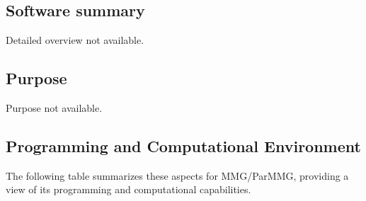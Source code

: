 \subsection{Software summary}
\label{sec:MMG/ParMMG:summary}
Detailed overview not available.



\subsection{Purpose}
\label{sec:MMG/ParMMG:purpose}
Purpose not available.

\subsection{Programming and Computational Environment}
\label{sec::MMG/ParMMG:environment_capabilities}


The following table summarizes these aspects for MMG/ParMMG, providing a  view of its programming and computational capabilities.


